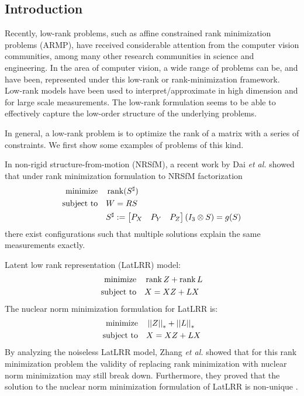 \documentclass[11pt]{article}
\begin{document}
\subsection{Introduction}

Recently, low-rank problems, such as affine constrained rank minimization problems (ARMP), have received considerable attention from the computer vision communities, among many other research communities in science and engineering. In the area of computer vision, a wide range of problems can be, and have been, represented under this low-rank or rank-minimization framework. Low-rank models have been used to interpret/approximate in high dimension and for large scale measurements. The low-rank formulation seems to be able to effectively capture the low-order structure of the underlying problems.

In general, a low-rank problem is to optimize the rank of a matrix with a series of constraints. We first show some examples of problems of this kind.

\begin{example}
    In non-rigid structure-from-motion (NRSfM), a recent work by Dai \emph{et al.} \cite{dai2014simple} showed that under rank minimization formulation to NRSfM factorization
    \[\begin{aligned}
        \textnormal{minimize}\quad & \operatorname{rank}(S^{\sharp})\\
        \textnormal{subject to}\quad & W=RS\\
        & S^{\sharp}:=\begin{bmatrix}P_X & P_Y & P_Z\end{bmatrix}\left(I_3\otimes S\right)=g(S)
    \end{aligned}\]
    there exist configurations such that multiple solutions explain the same measurements exactly.
\end{example}

\begin{example}\label{eg:latlrr}
    Latent low rank representation (LatLRR) model:
    \[\begin{aligned}
        \textnormal{minimize}\quad & \operatorname{rank} Z+\operatorname{rank} L\\
        \textnormal{subject to}\quad & X=XZ+LX
    \end{aligned}\]
    The nuclear norm minimization formulation for LatLRR is:
    \[\begin{aligned}
        \textnormal{minimize}\quad & \left|\left|Z\right|\right|_\ast+\left|\left|L\right|\right|_\ast\\
        \textnormal{subject to}\quad & X=XZ+LX
    \end{aligned}\]
    By analyzing the noiseless LatLRR model, Zhang \emph{et al.} \cite{zhang2013counterexample} showed that for this rank minimization problem the validity of replacing rank minimization with nuclear norm minimization may still break down. Furthermore, they proved that the solution to the nuclear norm minimization formulation of LatLRR is non-unique \cite{dai2014rank}.
\end{example}
\end{document}
